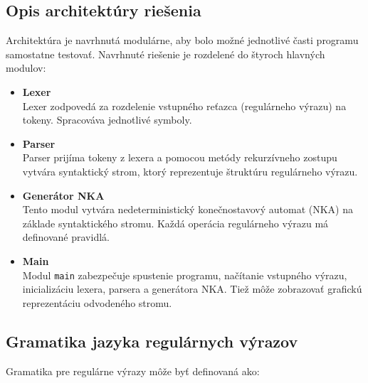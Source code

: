 \documentclass[a4paper,12pt]{article}
\begin{document}
\subsection{Opis architektúry riešenia}
Architektúra je navrhnutá modulárne, aby bolo možné  jednotlivé časti programu samostatne testovať.
Navrhnuté riešenie je rozdelené do štyroch hlavných modulov:

\begin{itemize}
    \item \textbf{Lexer} \\
    Lexer zodpovedá za rozdelenie vstupného reťazca (regulárneho výrazu) na tokeny. Spracováva jednotlivé symboly.
    \item \textbf{Parser} \\
    Parser prijíma tokeny z lexera a pomocou metódy rekurzívneho zostupu vytvára syntaktický strom, ktorý reprezentuje štruktúru regulárneho výrazu.

    \item \textbf{Generátor NKA} \\
    Tento modul vytvára nedeterministický konečnostavový automat (NKA) na základe syntaktického stromu. Každá operácia regulárneho výrazu má definované pravidlá.

    \item \textbf{Main} \\
    Modul \texttt{main} zabezpečuje spustenie programu, načítanie vstupného výrazu, inicializáciu lexera, parsera a generátora NKA. Tiež môže zobrazovať grafickú reprezentáciu odvodeného stromu.
\end{itemize}

\bigskip



\subsection{Gramatika jazyka regulárnych výrazov}

Gramatika pre regulárne výrazy môže byť definovaná ako:
\end{document}
